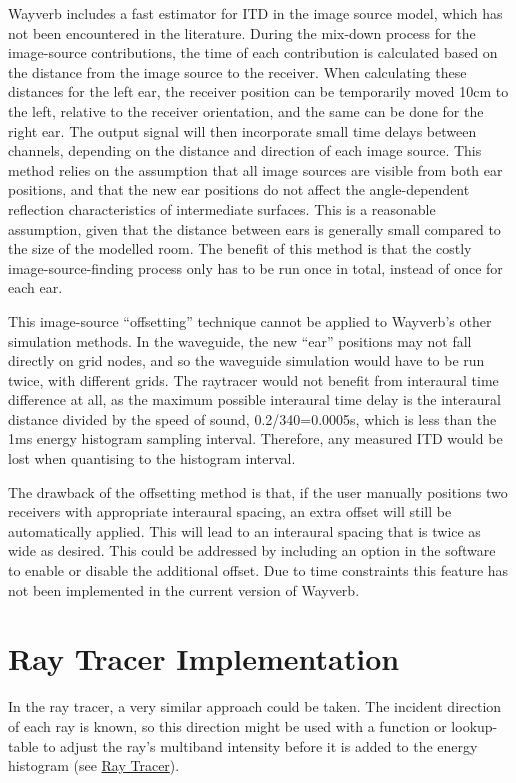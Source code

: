 \documentclass[]{scrreprt}
\begin{document}
Wayverb includes a fast estimator for ITD in the image source model,
which has not been encountered in the literature. During the mix-down
process for the image-source contributions, the time of each
contribution is calculated based on the distance from the image source
to the receiver. When calculating these distances for the left ear, the
receiver position can be temporarily moved 10cm to the left, relative to
the receiver orientation, and the same can be done for the right ear.
The output signal will then incorporate small time delays between
channels, depending on the distance and direction of each image source.
This method relies on the assumption that all image sources are visible
from both ear positions, and that the new ear positions do not affect
the angle-dependent reflection characteristics of intermediate surfaces.
This is a reasonable assumption, given that the distance between ears is
generally small compared to the size of the modelled room. The benefit
of this method is that the costly image-source-finding process only has
to be run once in total, instead of once for each ear.

This image-source ``offsetting'' technique cannot be applied to
Wayverb's other simulation methods. In the waveguide, the new ``ear''
positions may not fall directly on grid nodes, and so the waveguide
simulation would have to be run twice, with different grids. The
raytracer would not benefit from interaural time difference at all, as
the maximum possible interaural time delay is the interaural distance
divided by the speed of sound, 0.2/340=0.0005s, which is less than the
1ms energy histogram sampling interval. Therefore, any measured ITD
would be lost when quantising to the histogram interval.

The drawback of the offsetting method is that, if the user manually
positions two receivers with appropriate interaural spacing, an extra
offset will still be automatically applied. This will lead to an
interaural spacing that is twice as wide as desired. This could be
addressed by including an option in the software to enable or disable
the additional offset. Due to time constraints this feature has not been
implemented in the current version of Wayverb.

\section{Ray Tracer Implementation}\label{ray-tracer-implementation}

In the ray tracer, a very similar approach could be taken. The incident
direction of each ray is known, so this direction might be used with a
function or lookup-table to adjust the ray's multiband intensity before
it is added to the energy histogram (see
\href{\%7B\%7B\%20site.baseurl\%20\%7D\%7D\%7B\%\%20link\%20ray_tracer.md\%20\%\%7D}{Ray
Tracer}).
\end{document}
